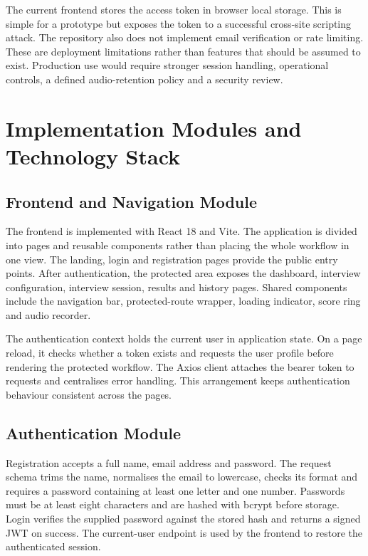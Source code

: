 \documentclass[12pt,a4paper,oneside]{report}
\begin{document}
The current frontend stores the access token in browser local storage. This is simple for a prototype but exposes the token to a successful cross-site scripting attack. The repository also does not implement email verification or rate limiting. These are deployment limitations rather than features that should be assumed to exist. Production use would require stronger session handling, operational controls, a defined audio-retention policy and a security review.

\chapter{Implementation Modules and Technology Stack}

\section{Frontend and Navigation Module}
The frontend is implemented with React 18 and Vite. The application is divided into pages and reusable components rather than placing the whole workflow in one view. The landing, login and registration pages provide the public entry points. After authentication, the protected area exposes the dashboard, interview configuration, interview session, results and history pages. Shared components include the navigation bar, protected-route wrapper, loading indicator, score ring and audio recorder.

The authentication context holds the current user in application state. On a page reload, it checks whether a token exists and requests the user profile before rendering the protected workflow. The Axios client attaches the bearer token to requests and centralises error handling. This arrangement keeps authentication behaviour consistent across the pages.

\section{Authentication Module}
Registration accepts a full name, email address and password. The request schema trims the name, normalises the email to lowercase, checks its format and requires a password containing at least one letter and one number. Passwords must be at least eight characters and are hashed with bcrypt before storage. Login verifies the supplied password against the stored hash and returns a signed JWT on success. The current-user endpoint is used by the frontend to restore the authenticated session.
\end{document}
